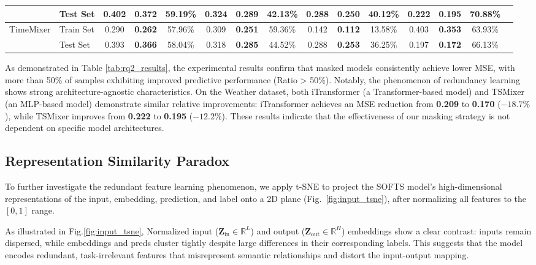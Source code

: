 \documentclass{article}
\begin{document}
\begin{table*}[htbp]
{\begin{tabular}{llccccccccccccc}
\multicolumn{1}{l|}{} & Test Set 
& 0.402 & \textbf{0.372} & 59.19\% 
& 0.324 & \textbf{0.289} & 42.13\% 
& 0.288 & \textbf{0.250} & 40.12\%
& 0.222 & \textbf{0.195} & 70.88\% \\
\midrule
\multicolumn{1}{l|}{\multirow{2}{*}{TimeMixer}}
& Train Set 
& 0.290 & \textbf{0.262} & 57.96\% 
& 0.309 & \textbf{0.251} & 59.36\% 
& 0.142 & \textbf{0.112} & 13.58\%
& 0.403 & \textbf{0.353} & 63.93\% \\
\multicolumn{1}{l|}{} & Test Set 
& 0.393 & \textbf{0.366} & 58.04\% 
& 0.318 & \textbf{0.285} & 44.52\% 
& 0.288 & \textbf{0.253} & 36.25\%
& 0.197 & \textbf{0.172} & 66.13\% \\
\bottomrule
\end{tabular}
}
\end{table*}
As demonstrated in Table \ref{tab:rq2_results}, the experimental results confirm that masked models consistently achieve lower MSE, with more than 50\% of samples exhibiting improved predictive performance (Ratio > 50\%). Notably, the phenomenon of redundancy learning shows strong architecture-agnostic characteristics. On the Weather dataset, both iTransformer (a Transformer-based model) and TSMixer (an MLP-based model) demonstrate similar relative improvements: iTransformer achieves an MSE reduction from \textbf{0.209} to \textbf{0.170} ($-18.7\%$), while TSMixer improves from \textbf{0.222} to \textbf{0.195} ($-12.2\%$). These results indicate that the effectiveness of our masking strategy is not dependent on specific model architectures.

\subsection{Representation Similarity Paradox}
\label{Paradox}
To further investigate the redundant feature learning phenomenon, we apply t-SNE to project the SOFTS model’s high-dimensional representations of the input, embedding, prediction, and label onto a 2D plane (Fig.~\ref{fig:input_tsne}), after normalizing all features to the $[0,1]$ range.


As illustrated in Fig.\ref{fig:input_tsne}, Normalized input ($\mathbf{Z}_{\text{in}} \in \mathbb{R}^L$) and output ($\mathbf{Z}_{\text{out}} \in \mathbb{R}^H$) embeddings show a clear contrast: inputs remain dispersed, while embeddings and preds cluster tightly despite large differences in their corresponding labels. This suggests that the model encodes redundant, task-irrelevant features that misrepresent semantic relationships and distort the input-output mapping.
\end{document}
